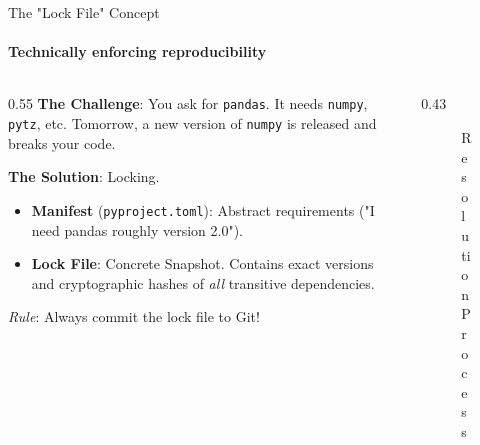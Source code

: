\documentclass[aspectratio=169]{beamer}
\begin{document}
\begin{frame}[t]{The "Lock File" Concept}
    \framesubtitle{Technically enforcing reproducibility}
    \vspace*{-0.5cm}
    \begin{columns}[T,onlytextwidth]
        \begin{column}{0.55\textwidth}
            \textbf{The Challenge}:
            You ask for \texttt{pandas}. It needs \texttt{numpy}, \texttt{pytz}, etc.
            Tomorrow, a new version of \texttt{numpy} is released and breaks your code.

            \textbf{The Solution}: Locking.
            \begin{itemize}
                \item \textbf{Manifest} (\texttt{pyproject.toml}): Abstract requirements ("I need pandas roughly version 2.0").
                \item \textbf{Lock File}: Concrete Snapshot. Contains exact versions and cryptographic hashes of \textit{all} transitive dependencies.
            \end{itemize}
            \textit{Rule}: Always commit the lock file to Git!
        \end{column}
        \begin{column}{0.43\textwidth}
            \begin{figure}[H]
                \centering
                \caption{Resolution Process}
            \end{figure}
        \end{column}
    \end{columns}
\end{frame}
\end{document}
